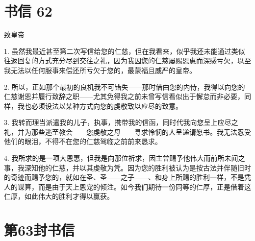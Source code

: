 \section{书信 62}

\par

致皇帝\par

1. 虽然我最近甚至第二次写信给您的仁慈，但在我看来，似乎我还未能通过类似往返回复的方式充分尽到交往之礼，因为我因您的仁慈屡赐恩惠而深感亏欠，以至我无法以任何服事来偿还所亏欠于您的，最蒙福且威严的皇帝。\par

2. 所以，正如那个最初的良机我不可错失——那时借由您的内侍，我得以向您的仁慈谢恩并履行致辞之职——尤其免得我之前未曾写信看似出于懈怠而非必要，同样，我也必须设法以某种方式向您的虔敬致以应尽的致意。\par

3. 我转而理当派遣我的儿子，执事，携带我的信函，同时代我向您呈上应尽之礼，并为那些逃至教会——您虔敬之母——寻求怜悯的人呈递请愿书。我无法忍受他们的眼泪，不得不在您的仁慈驾临之前前来恳求。\par

4. 我所求的是一项大恩惠，但我是向那位祈求，因主曾赐予他伟大而前所未闻之事，我深知他的仁慈，并以其虔敬为凭。因为您的胜利被认为是按古法并伴随旧时的奇迹而赐予您的，就如在圣、圣——之子——、和身上所赐的胜利一样，不是凭人的谋算，而是由于天上恩宠的倾注。如今我们期待一份同等的仁厚，正是借着这仁厚，如此伟大的胜利才得以赢获。\par



\section{第63封书信}

